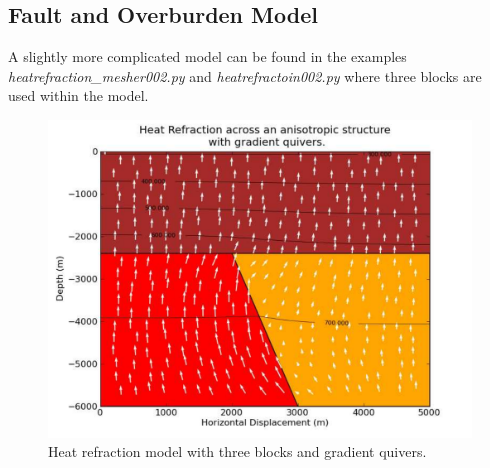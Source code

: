 \subsection{Fault and Overburden Model}
A slightly more complicated model can be found in the examples \textit{heatrefraction_mesher002.py} and \textit{heatrefractoin002.py} where three blocks are used within the model.
\begin{figure}[ht]
\centerline{\includegraphics[width=4.in]{figures/heatrefraction002contqu}}
\caption{Heat refraction model with three blocks and gradient quivers.}
\end{figure}

